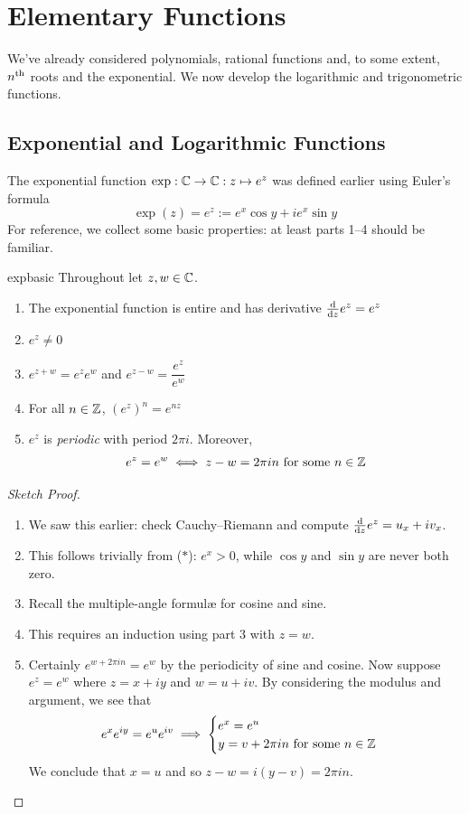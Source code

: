 \graphicspath{{3functions/asy/}}
\thispagestyle{empty}


\section{Elementary Functions}\label{chap:functions}

We've already considered polynomials, rational functions and, to some extent, $n\textsuperscript{th}$ roots and the exponential. We now develop the logarithmic and trigonometric functions.

\subsection[Exponential and Logarithmic Functions]{Exponential and Logarithmic Functions}%

The exponential function $\exp:\mathbb{C}\to\mathbb{C}:z\mapsto e^z$ was defined earlier using Euler's formula
\[\exp(z)=e^z:=e^x\cos y+ie^x\sin y \tag{$\ast$}\]
For reference, we collect some basic properties: at least parts 1--4 should be familiar.

\begin{lemm}{}{expbasic}
Throughout let $z,w\in\mathbb{C}$.
\begin{enumerate}\itemsep1pt
  \item The exponential function is entire and has derivative $\frac{\mathrm{d} }{\mathrm{d} z}e^z=e^z$
  \item $e^z\neq 0$
  \item $e^{z+w}=e^{z}e^{w}$ and $e^{z-w}=\dfrac{e^{z}}{e^{w}}$
  \item For all $n\in\mathbb{Z}$, $(e^z)^n=e^{nz}$
  \item\label{lemmpart:exp5} $e^z$ is \emph{periodic} with period $2\pi i$. Moreover,
  \[e^z=e^w\iff z-w=2\pi in\text{ for some }n\in\mathbb{Z}\]
\end{enumerate}
\end{lemm}

\begin{proof}[Sketch Proof]
\begin{enumerate}\itemsep1pt
  \item We saw this earlier: check Cauchy--Riemann and compute $\frac{\mathrm{d} }{\mathrm{d} z}e^z=u_x+iv_x$.
  \item This follows trivially from ($\ast$): $e^x>0$, while $\cos y$ and $\sin y$ are never both zero.
  \item Recall the multiple-angle formulæ for cosine and sine.
  \item This requires an induction using part 3 with $z=w$.
	\item Certainly $e^{w+2\pi in}=e^w$ by the periodicity of sine and cosine. Now suppose $e^z=e^w$ where $z=x+iy$ and $w=u+iv$. By considering the modulus and argument, we see that
	\[e^xe^{iy}=e^ue^{iv}\implies \begin{cases}
	e^x=e^u\\
	y=v+2\pi in\text{ for some }n\in\mathbb{Z}
	\end{cases}\]
	We conclude that $x=u$ and so $z-w=i(y-v)=2\pi in$.\qedhere
\end{enumerate}
\end{proof}

